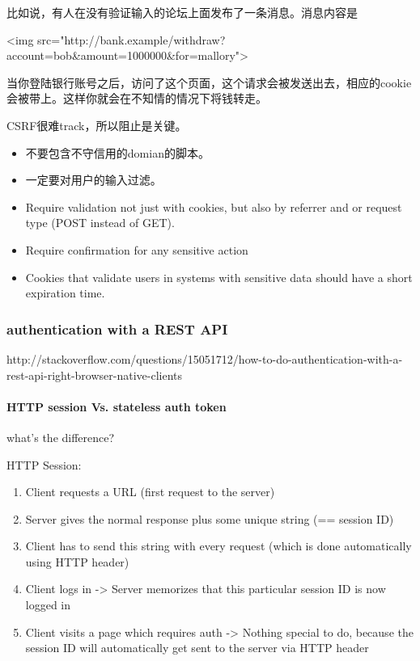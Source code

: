 比如说，有人在没有验证输入的论坛上面发布了一条消息。消息内容是
\begin{JavaScript}
<img src="http://bank.example/withdraw?account=bob&amount=1000000&for=mallory">
\end{JavaScript}

当你登陆银行账号之后，访问了这个页面，这个请求会被发送出去，相应的cookie会被带上。这样你就会在不知情的情况下将钱转走。


CSRF很难track，所以阻止是关键。

\begin{itemize}
\item 不要包含不守信用的domian的脚本。
\item 一定要对用户的输入过滤。
\item Require validation not just with cookies, but also by referrer and or request type (POST instead of GET).
\end{itemize}

\begin{itemize}
\item Require confirmation for any sensitive action
\item Cookies that validate users in systems with sensitive data should have a short expiration time.
\end{itemize}

\subsubsection{authentication with a REST API}
http://stackoverflow.com/questions/15051712/how-to-do-authentication-with-a-rest-api-right-browser-native-clients

\paragraph{HTTP session Vs. stateless auth token} what's the difference?

HTTP Session:

\begin{enumerate}
\item Client requests a URL (first request to the server)
\item Server gives the normal response plus some unique string (== session ID)
\item Client has to send this string with every request (which is done automatically using HTTP header)
\item Client logs in -> Server memorizes that this particular session ID is now logged in
\item Client visits a page which requires auth -> Nothing special to do, because the session ID will automatically get sent to the server via HTTP header
\end{enumerate}

